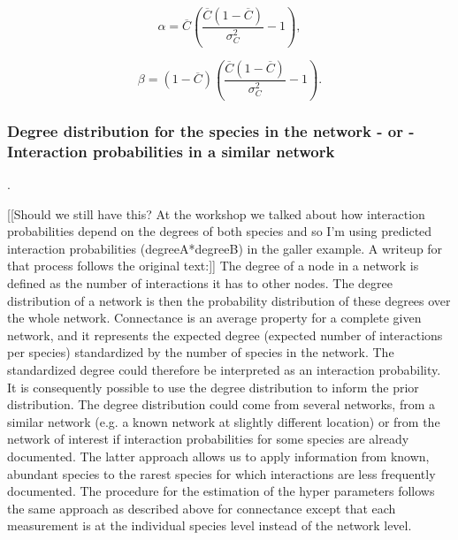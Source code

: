 \documentclass[12pt]{article}
\begin{document}
          \begin{equation}
          \alpha = \overline{C}(\frac{\overline{C}(1-\overline{C})}{\sigma_C^2}-1) ,
          \end{equation}

          \begin{equation}
          \beta = (1-\overline{C})(\frac{\overline{C}(1-\overline{C})}{\sigma_C^2}-1) .
          \end{equation}
    


      \subsubsection*{Degree distribution for the species in the network - or - Interaction probabilities in a similar network}.

          [[Should we still have this? At the workshop we talked about how interaction probabilities depend on the degrees of both species and so I'm using predicted interaction probabilities (degreeA*degreeB) in the galler example. A writeup for that process follows the original text:]]
          The degree of a node in a network is defined as the number of interactions it has to other nodes. The degree distribution of a network is then the probability distribution of these degrees over the whole network. Connectance is an average property for a complete given network, and it represents the expected degree (expected number of interactions per species) standardized by the number of species in the network. The standardized degree could therefore be interpreted as an interaction probability. It is consequently possible to use the degree distribution to inform the prior distribution. The degree distribution could come from several networks, from a similar network (e.g. a known network at slightly different location) or from the network of interest if interaction probabilities for some species are already documented. The latter approach allows us to apply information from known, abundant species to the rarest species for which interactions are less frequently documented. The procedure for the estimation of the hyper parameters follows the same approach as described above for connectance except that each measurement is at the individual species level instead of the network level.
\end{document}
